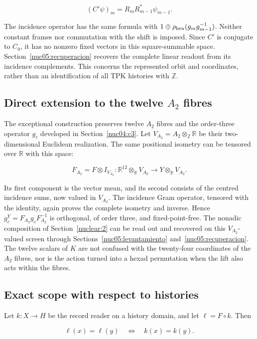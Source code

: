 \[
(C'\psi)_m=R_mR_{m-1}^*\psi_{m-1}.
\]

The incidence operator has the same formula with \(1\oplus\rho_{\rm hex}(g_mg_{m-1}^{-1})\). Neither constant frames nor commutation with the shift is imposed. Since \(C'\) is conjugate to \(C_0\), it has no nonzero fixed vectors in this square-summable space. Section~\ref{nuc05:recuperacion} recovers the complete linear readout from its incidence complements. This concerns the represented orbit and coordinates, rather than an identification of all TPK histories with \(\mathbb Z\).

\subsection{Direct extension to the twelve \texorpdfstring{\(A_2\)}{A2} fibres}\label{nuc05:a2}

The exceptional construction preserves twelve \(A_2\) fibres and the order-three operator \(g_c\) developed in Section~\ref{nuc04:c3}. Let \(V_{A_2}=A_2\otimes_{\mathbb Z}\mathbb R\) be their two-dimensional Euclidean realization. The same positional isometry can be tensored over \(\mathbb R\) with this space:

\[
F_{A_2}=F\otimes I_{V_{A_2}}:
\mathbb R^{12}\otimes_{\mathbb R}V_{A_2}
\longrightarrow Y\otimes_{\mathbb R}V_{A_2}.
\]

Its first component is the vector mean, and its second consists of the centred incidence sums, now valued in \(V_{A_2}\). The incidence Gram operator, tensored with the identity, again proves the complete isometry and inverse. Hence \(g_c^Y=F_{A_2}g_cF_{A_2}^{-1}\) is orthogonal, of order three, and fixed-point-free. The nonadic composition of Section~\ref{nuclear:2} can be read out and recovered on this \(V_{A_2}\)-valued screen through Sections~\ref{nuc05:levantamiento} and~\ref{nuc05:recuperacion}. The twelve scalars of \(K\) are not confused with the twenty-four coordinates of the \(A_2\) fibres, nor is the action turned into a hexad permutation when the lift also acts within the fibres.

\subsection{Exact scope with respect to histories}

Let \(k:X\to H\) be the record reader on a history domain, and let \(\ell=F\circ k\). Then

\[
\ell(x)=\ell(y)\quad\Longleftrightarrow\quad k(x)=k(y).
\]

